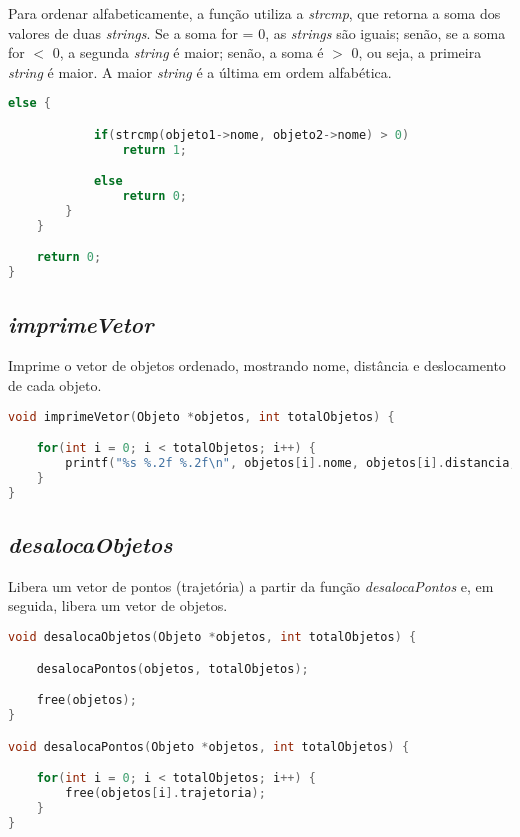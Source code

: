 \documentclass{article}
\begin{document}
\clearpage

\hspace*{\parindent}Para ordenar alfabeticamente, a função utiliza a \textit{strcmp}, que retorna a soma dos valores de duas \textit{strings}. Se a soma for = 0, as \textit{strings} são iguais; senão, se a soma for $<$ 0, a segunda \textit{string} é maior; senão, a soma é $>$ 0, ou seja, a primeira \textit{string} é maior. A maior \textit{string} é a última em ordem alfabética.

\begin{lstlisting}[label={lst:cod1},language=C]
        else {

            if(strcmp(objeto1->nome, objeto2->nome) > 0)
                return 1;

            else
                return 0;
        }
    }

    return 0;
}
\end{lstlisting}


\subsection{\textit{imprimeVetor}}

\hspace*{\parindent}Imprime o vetor de objetos ordenado, mostrando nome, distância e deslocamento de cada objeto.

\begin{lstlisting}[label={lst:cod1},language=C]
void imprimeVetor(Objeto *objetos, int totalObjetos) {

    for(int i = 0; i < totalObjetos; i++) {
        printf("%s %.2f %.2f\n", objetos[i].nome, objetos[i].distancia, objetos[i].deslocamento);
    }
}
\end{lstlisting}


\subsection{\textit{desalocaObjetos}}

\hspace*{\parindent}Libera um vetor de pontos (trajetória) a partir da função \textit{desalocaPontos} e, em seguida, libera um vetor de objetos.

\begin{lstlisting}[label={lst:cod1},language=C]
void desalocaObjetos(Objeto *objetos, int totalObjetos) {

    desalocaPontos(objetos, totalObjetos);

    free(objetos);
}

void desalocaPontos(Objeto *objetos, int totalObjetos) {   

    for(int i = 0; i < totalObjetos; i++) {
        free(objetos[i].trajetoria);
    }
}
\end{lstlisting}
\end{document}
